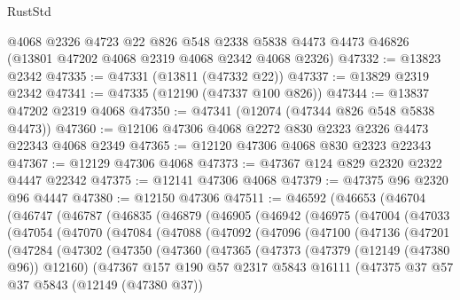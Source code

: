 \begin{lexlean}{RustStd}
\begin{coremodule}
    @4068
    @2326
    @4723
    @22
    @826
    @548
    @2338
    @5838
    @4473
    @4473
    @46826
    (@13801 @47202 @4068 @2319 @4068 @2342 @4068 @2326)
@47332 := @13823 @2342
@47335 := @47331 (@13811 (@47332 @22))
@47337 := @13829 @2319 @2342
@47341 := @47335 (@12190 (@47337 @100 @826))
@47344 := @13837 @47202 @2319 @4068
@47350 := @47341 (@12074 (@47344 @826 @548 @5838 @4473))
@47360 := @12106 @47306 @4068 @2272 @830 @2323 @2326 @4473 @22343 @4068 @2349
@47365 := @12120 @47306 @4068 @830 @2323 @22343
@47367 := @12129 @47306 @4068
@47373 := @47367 @124 @829 @2320 @2322 @4447 @22342
@47375 := @12141 @47306 @4068
@47379 := @47375 @96 @2320 @96 @4447
@47380 := @12150 @47306
@47511 := @46592
    (@46653
      (@46704
        (@46747
          (@46787
            (@46835
              (@46879
                (@46905
                  (@46942
                    (@46975
                      (@47004
                        (@47033
                          (@47054
                            (@47070
                              (@47084
                                (@47088
                                  (@47092
                                    (@47096
                                      (@47100
                                        (@47136
                                          (@47201
                                            (@47284
                                              (@47302
                                                (@47350
                                                  (@47360
                                                    (@47365
                                                      (@47373
                                                        (@47379 (@12149 (@47380 @96)) @12160)
                                                        (@47367
                                                          @157
                                                          @190
                                                          @57
                                                          @2317
                                                          @5843
                                                          @16111
                                                          (@47375
                                                            @37
                                                            @57
                                                            @37
                                                            @5843
                                                            (@12149 (@47380 @37))

\end{coremodule}
\end{lexlean}
